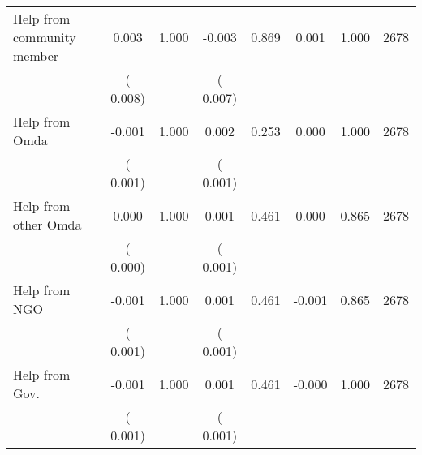 \begin{tabular}{l*{7}{c}}
 Help from community member       &              0.003       &        1.000  &             -0.003       &        0.869  &              0.001       &              1.000 &  2678 \\ 
                       &       (       0.008)             &                               &       (       0.007)                     &                               &                                               &                                &                      \\ 

 Help from Omda       &             -0.001       &        1.000  &              0.002       &        0.253  &              0.000       &              1.000 &  2678 \\ 
                       &       (       0.001)             &                               &       (       0.001)                     &                               &                                               &                                &                      \\ 

 Help from other Omda       &              0.000       &        1.000  &              0.001       &        0.461  &              0.000       &              0.865 &  2678 \\ 
                       &       (       0.000)             &                               &       (       0.001)                     &                               &                                               &                                &                      \\ 

 Help from NGO       &             -0.001       &        1.000  &              0.001       &        0.461  &             -0.001       &              0.865 &  2678 \\ 
                       &       (       0.001)             &                               &       (       0.001)                     &                               &                                               &                                &                      \\ 

 Help from Gov.       &             -0.001       &        1.000  &              0.001       &        0.461  &             -0.000       &              1.000 &  2678 \\ 
                       &       (       0.001)             &                               &       (       0.001)                     &                               &                                               &                                &                      \\ 

\hline \end{tabular}